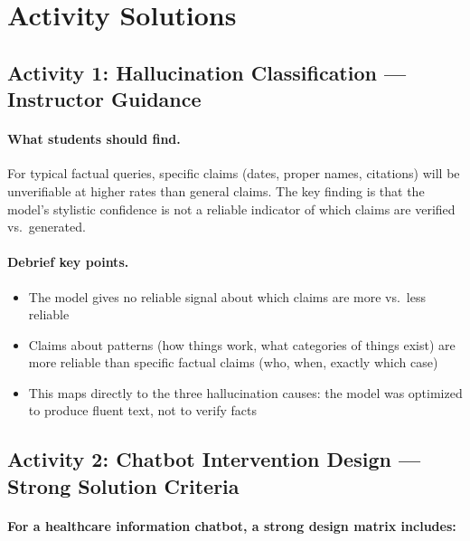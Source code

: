 \section{Activity Solutions}

\subsection{Activity 1: Hallucination Classification --- Instructor Guidance}

\paragraph{What students should find.}
For typical factual queries, specific claims (dates, proper names, citations) will be unverifiable at higher rates than general claims. The key finding is that the model's stylistic confidence is not a reliable indicator of which claims are verified vs.\ generated.

\paragraph{Debrief key points.}
\begin{itemize}
    \item The model gives no reliable signal about which claims are more vs.\ less reliable
    \item Claims about patterns (how things work, what categories of things exist) are more reliable than specific factual claims (who, when, exactly which case)
    \item This maps directly to the three hallucination causes: the model was optimized to produce fluent text, not to verify facts
\end{itemize}

\subsection{Activity 2: Chatbot Intervention Design --- Strong Solution Criteria}

\paragraph{For a healthcare information chatbot, a strong design matrix includes:}

